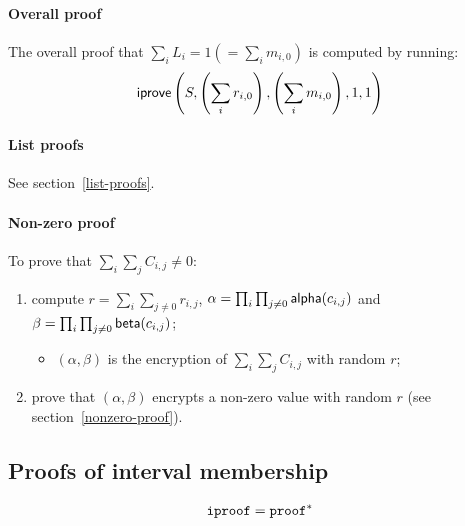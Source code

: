 \documentclass[a4paper]{article}
\begin{document}
\paragraph{Overall proof} The overall proof that
$\sum_i L_i=1(=\sum_i m_{i,0})$ is computed by running:
\[\textsf{iprove}\left(S,\left(\sum_i r_{i,0}\right),\left(\sum_i
      m_{i,0}\right),1,1\right)\]

\paragraph{List proofs} See section~\ref{list-proofs}.

\paragraph{Non-zero proof} To prove that $\sum_i\sum_jC_{i,j}\neq 0$:
\begin{enumerate}
\item compute $r=\sum_i\sum_{j\neq 0}r_{i,j}$,
  $\alpha=\prod_i\prod_{j\neq 0}\textsf{alpha}(c_{i,j})$ and
  $\beta=\prod_i\prod_{j\neq 0}\textsf{beta}(c_{i,j})$;
  \begin{itemize}
  \item $(\alpha,\beta)$ is the encryption of $\sum_i\sum_jC_{i,j}$
    with random $r$;
  \end{itemize}
\item prove that $(\alpha,\beta)$ encrypts a non-zero value with
  random $r$ (see section~\ref{nonzero-proof}).
\end{enumerate}

\subsection{Proofs of interval membership}
\label{iproof}

\begin{gather*}
  \texttt{iproof}=\texttt{proof}^\ast
\end{gather*}
\end{document}
